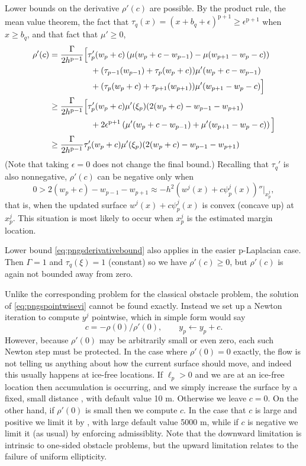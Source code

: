 \documentclass[letterpaper,final,12pt,reqno]{amsart}
\theoremstyle{claim}
\newcommand{\eps}{\epsilon}
\newcommand{\pp}{{\text{p}}}
\numberwithin{equation}{section}
\numberwithin{figure}{section}
\numberwithin{table}{section}
\numberwithin{theorem}{section}
\begin{document}
Lower bounds on the derivative $\rho'(c)$ are possible.  By the product rule, the mean value theorem, the fact that $\tau_q(x) = (x+b_q+\eps)^{\pp+1} \ge \eps^{\pp+1}$ when $x\ge b_q$, and that fact that $\mu'\ge 0$,
\begin{align}
  \rho'(c) &= \frac{\Gamma}{2h^{\pp-1}} \Big[\tau_p'(w_p+c) \left(\mu(w_p+c-w_{p-1}) -  \mu(w_{p+1}-w_p-c)\right) \label{eq:pngsderivativebound} \\
        &\qquad\qquad\quad + (\tau_{p-1}(w_{p-1}) + \tau_p(w_p+c)) \mu'(w_p+c-w_{p-1}) \notag \\
        &\qquad\qquad\quad + (\tau_p(w_p+c) + \tau_{p+1}(w_{p+1})) \mu'(w_{p+1}-w_p-c)\Big] \notag \\
        &\ge \frac{\Gamma}{2h^{\pp-1}} \Big[\tau_p'(w_p+c) \mu'(\xi_p) (2(w_p+c) - w_{p-1} - w_{p+1}) \notag \\
        &\qquad\qquad\quad + 2 \eps^{\pp+1} \left(\mu'(w_p+c-w_{p-1}) + \mu'(w_{p+1}-w_p-c)\right)\Big] \notag \\
        &\ge \frac{\Gamma}{2h^{\pp-1}} \tau_p'(w_p+c) \mu'(\xi_p) (2(w_p+c) - w_{p-1} - w_{p+1}) \notag
\end{align}
(Note that taking $\eps=0$ does not change the final bound.)  Recalling that $\tau_q'$ is also nonnegative, $\rho'(c)$ can be negative only when
    $$0 > 2(w_p+c) - w_{p-1} - w_{p+1} \approx - h^2\left(w^j(x) + c \psi_p^j(x)\right)''\Big|_{x_p^j},$$
that is, when the updated surface $w^j(x) + c \psi_p^j(x)$ is convex (concave up) at $x_p^j$.  This situation is most likely to occur when $x_p^j$ is the estimated margin location.

Lower bound \eqref{eq:pngsderivativebound} also applies in the easier $\pp$-Laplacian case.  Then $\Gamma=1$ and $\tau_q(\xi)=1$ (constant) so we have $\rho'(c)\ge 0$, but $\rho'(c)$ is again not bounded away from zero.

Unlike the corresponding problem for the classical obstacle problem, the solution of \eqref{eq:pngspointwisevi} cannot be found exactly.  Instead we set up a Newton iteration to compute $y^j$ pointwise, which in simple form would say
\begin{equation}
    c = -\rho(0) / \rho'(0), \qquad y_p \gets y_p + c. \label{eq:pngspointNewton}
\end{equation}
However, because $\rho'(0)$ may be arbitrarily small or even zero, each such Newton step must be protected.  In the case where $\rho'(0)=0$ exactly, the flow is not telling us anything about how the current surface should move, and indeed this usually happens at ice-free locations.  If $\ell_p > 0$ and we are at an ice-free location then accumulation is occurring, and we simply increase the surface by a fixed, small distance , with default value 10 m.  Otherwise we leave $c=0$.  On the other hand, if $\rho'(0)$ is small then we compute $c$.  In the case that $c$ is large and positive we limit it by , with large default value 5000 m, while if $c$ is negative we limit it (as usual) by enforcing admissiblity.  Note that the downward limitation is intrinsic to one-sided obstacle problems, but the upward limitation relates to the failure of uniform ellipticity.
\end{document}
